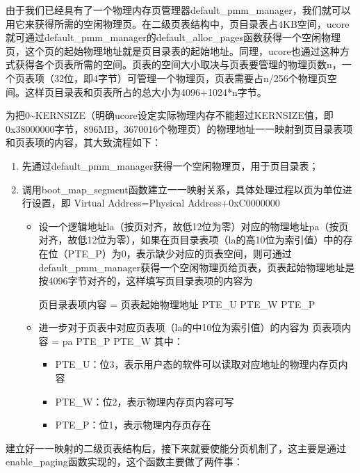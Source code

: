 由于我们已经具有了一个物理内存页管理器default\_pmm\_manager，我们就可以用它来获得所需的空闲物理页。在二级页表结构中，页目录表占4KB空间，ucore就可通过default\_pmm\_manager的default\_alloc\_pages函数获得一个空闲物理页，这个页的起始物理地址就是页目录表的起始地址。同理，ucore也通过这种方式获得各个页表所需的空间。页表的空间大小取决与页表要管理的物理页数n，一个页表项（32位，即4字节）可管理一个物理页，页表需要占n/256个物理页空间。这样页目录表和页表所占的总大小为4096+1024*n字节。

为把0\textasciitilde{}KERNSIZE（明确ucore设定实际物理内存不能超过KERNSIZE值，即0x38000000字节，896MB，3670016个物理页）的物理地址一一映射到页目录表项和页表项的内容，其大致流程如下：

\begin{enumerate}
\def\labelenumi{\arabic{enumi}.}
\item
  先通过default\_pmm\_manager获得一个空闲物理页，用于页目录表；
\item
  调用boot\_map\_segment函数建立一一映射关系，具体处理过程以页为单位进行设置，即
  Virtual Address=Physical Address+0xC0000000

  \begin{itemize}
  \item
    设一个逻辑地址la（按页对齐，故低12位为零）对应的物理地址pa（按页对齐，故低12位为零），如果在页目录表项（la的高10位为索引值）中的存在位（PTE\_P）为0，表示缺少对应的页表空间，则可通过default\_pmm\_manager获得一个空闲物理页给页表，页表起始物理地址是按4096字节对齐的，这样填写页目录表项的内容为

    页目录表项内容 = 页表起始物理地址\textbar{} PTE\_U \textbar{} PTE\_W
    \textbar{} PTE\_P
  \item
    进一步对于页表中对应页表项（la的中10位为索引值）的内容为 页表项内容
    = pa \textbar{} PTE\_P \textbar{} PTE\_W 其中：

    \begin{itemize}
    \tightlist
    \item
      PTE\_U：位3，表示用户态的软件可以读取对应地址的物理内存页内容
    \item
      PTE\_W：位2，表示物理内存页内容可写
    \item
      PTE\_P：位1，表示物理内存页存在
    \end{itemize}
  \end{itemize}
\end{enumerate}

建立好一一映射的二级页表结构后，接下来就要使能分页机制了，这主要是通过enable\_paging函数实现的，这个函数主要做了两件事：

